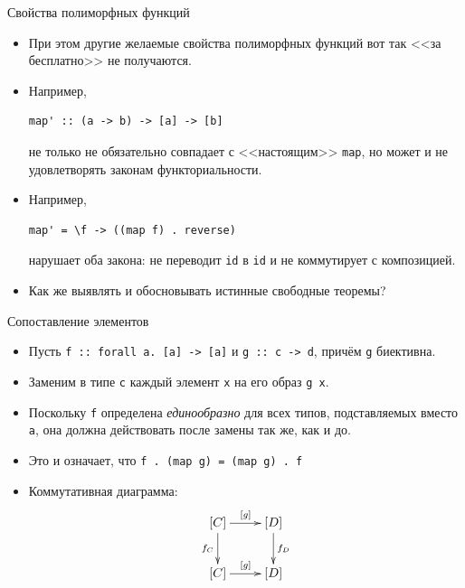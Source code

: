 \documentclass[xcolor=dvipsnames]{beamer}
\begin{document}
\begin{frame}[fragile]{Свойства полиморфных функций}
 
 \begin{itemize}[<+->]
  \item При этом другие желаемые свойства полиморфных функций вот так <<за бесплатно>> не получаются.
  \item Например,
\begin{verbatim}
map' :: (a -> b) -> [a] -> [b]
\end{verbatim}
не только не обязательно совпадает с <<настоящим>> {\tt map}, но может и не удовлетворять законам функториальности.
   \item Например, 
\begin{verbatim}
map' = \f -> ((map f) . reverse)
\end{verbatim}
 нарушает оба закона: не переводит {\tt id} в {\tt id} и не коммутирует с композицией.
 \item Как же выявлять и обосновывать  истинные свободные теоремы?
 \end{itemize}

\end{frame}


\begin{frame}{Сопоставление элементов}

\begin{itemize}[<+->]
 \item Пусть \texttt{f :: forall a. [a] -> [a]} и \texttt{g :: c -> d}, причём {\tt g} биективна.
 \item Заменим в типе {\tt c} каждый элемент {\tt x} на его образ {\tt g x}.
 \item Поскольку {\tt f} определена {\em единообразно} для всех типов, подставляемых вместо {\tt a}, она должна действовать после замены так же, как и до.
 \item Это и означает, что \texttt{f . (map g) = (map g) . f}
 \item Коммутативная диаграмма:
 \[
  \xymatrix
  {
  [C] \ar[r]^{[g]} \ar[d]_{f_C} & [D] 
  \ar[d]^{f_D} \\
  [C] \ar[r]^{[g]} & [D]
  }
 \]

\end{itemize}


\end{frame}
\end{document}
